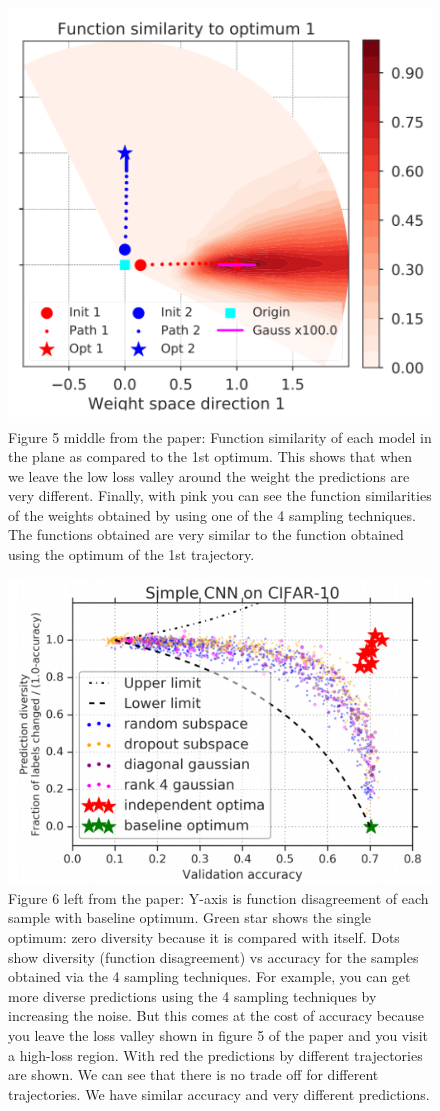 \begin{figure}
	\centering
	\includegraphics[width=0.7\linewidth]{./Figures/Figure5middle.png}
	\caption{Figure 5 middle from the paper: 
		Function similarity of each model in the plane as compared to the 1st optimum. This shows that when we leave the low loss valley around the weight the predictions are very different. Finally, with pink you can see the function similarities of the weights obtained by using one of the 4 sampling techniques. The functions obtained are very similar to the function obtained using the optimum of the 1st trajectory.}
	\label{}
\end{figure}
\begin{figure}
	\centering
	\includegraphics[width=0.7\linewidth]{./Figures/Figure6.png}
	\caption{Figure 6 left from the paper: 
		Y-axis is function disagreement of each sample with baseline optimum. Green star shows the single optimum: zero diversity because it is compared with itself. Dots show diversity (function disagreement) vs accuracy for the samples obtained via the 4 sampling techniques. For example, you can get more diverse predictions using the 4 sampling techniques by increasing the noise. But this comes at the cost of accuracy because you leave the loss valley shown in figure 5 of the paper and you visit a high-loss region. With red the predictions by different trajectories are shown. We can see that there is no trade off for different trajectories. We have similar accuracy and very different predictions.}
	\label{}
\end{figure}

